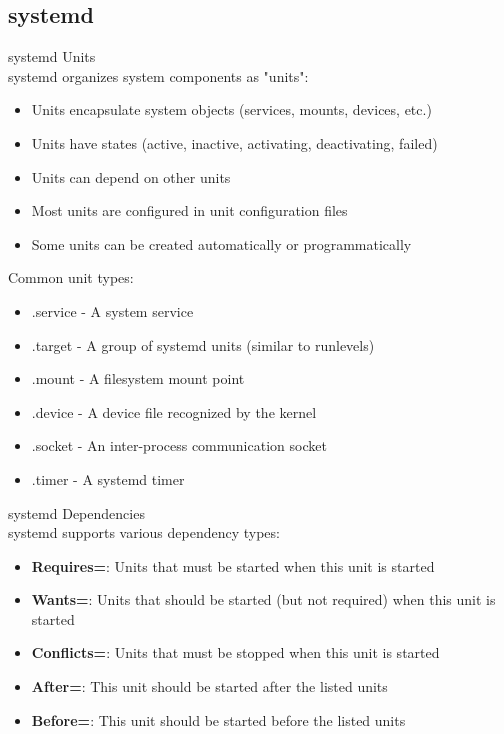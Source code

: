 \subsection{systemd}

\begin{definition}{systemd Units}\\
    systemd organizes system components as "units":
    \begin{itemize}
        \item Units encapsulate system objects (services, mounts, devices, etc.)
        \item Units have states (active, inactive, activating, deactivating, failed)
        \item Units can depend on other units
        \item Most units are configured in unit configuration files
        \item Some units can be created automatically or programmatically
    \end{itemize}
    
    Common unit types:
    \begin{itemize}
        \item .service - A system service
        \item .target - A group of systemd units (similar to runlevels)
        \item .mount - A filesystem mount point
        \item .device - A device file recognized by the kernel
        \item .socket - An inter-process communication socket
        \item .timer - A systemd timer
    \end{itemize}
\end{definition}

\begin{definition}{systemd Dependencies}\\
    systemd supports various dependency types:
    \begin{itemize}
        \item \textbf{Requires=}: Units that must be started when this unit is started
        \item \textbf{Wants=}: Units that should be started (but not required) when this unit is started
        \item \textbf{Conflicts=}: Units that must be stopped when this unit is started
        \item \textbf{After=}: This unit should be started after the listed units
        \item \textbf{Before=}: This unit should be started before the listed units
    \end{itemize}
\end{definition}

